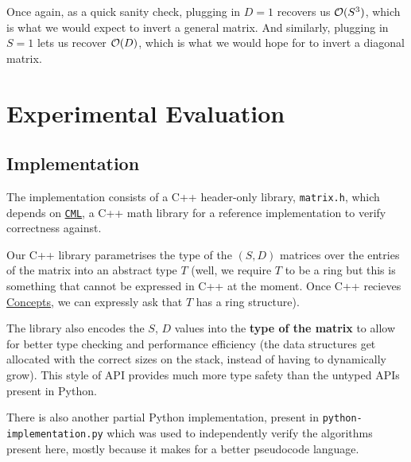 \documentclass[11pt]{article}
\begin{document}
Once again, as a quick sanity check, plugging in $D = 1$ recovers us $\mathcal{O}(S^3)$, which
is what we would expect to invert a general matrix. And similarly, plugging in
$S = 1$ lets us recover $\mathcal{O}(D)$, which is what we would hope for to invert
a diagonal matrix.

\section{Experimental Evaluation}
\subsection{Implementation}
The implementation consists of a C++ header-only library, \texttt{matrix.h},
which depends on \href{https://github.com/MichaelJWelsh/cml}{\texttt{CML}}, 
a C++ math library for a reference implementation to verify correctness against.

Our C++ library parametrises the type of the $(S, D)$ matrices over
the entries of the matrix into an abstract type $T$ (well, we require $T$ to
be a ring but this is something that cannot be expressed in C++ at the moment.
Once C++ recieves \href{https://github.com/MichaelJWelsh/cml}{Concepts}, 
we can expressly ask that $T$ has a ring structure).

The library also encodes the $S$, $D$ values into the \textbf{type of the matrix}
to allow for better type checking and performance efficiency
(the data structures get allocated with the correct sizes on the
stack, instead of having to dynamically grow). This style of API provides
much more type safety than the untyped APIs present in Python.

There is also another partial Python implementation, present in
\texttt{python-implementation.py} which was used to independently verify
the algorithms present here, mostly because it makes for a better pseudocode
language.
\end{document}

